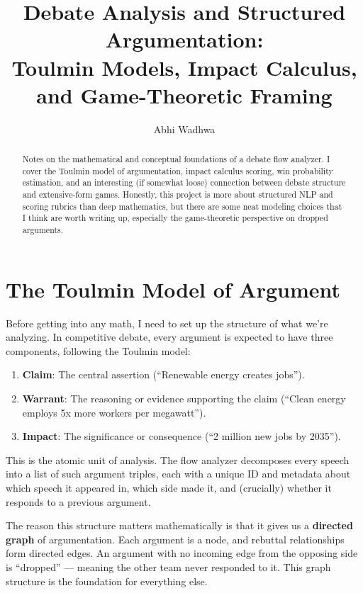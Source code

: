 \documentclass[11pt]{article}
\title{Debate Analysis and Structured Argumentation:\\Toulmin Models, Impact Calculus, and Game-Theoretic Framing}
\author{Abhi Wadhwa}
\date{}
\begin{document}
\maketitle

\begin{abstract}
Notes on the mathematical and conceptual foundations of a debate flow analyzer. I cover the Toulmin model of argumentation, impact calculus scoring, win probability estimation, and an interesting (if somewhat loose) connection between debate structure and extensive-form games. Honestly, this project is more about structured NLP and scoring rubrics than deep mathematics, but there are some neat modeling choices that I think are worth writing up, especially the game-theoretic perspective on dropped arguments.
\end{abstract}

\section{The Toulmin Model of Argument}

Before getting into any math, I need to set up the structure of what we're analyzing. In competitive debate, every argument is expected to have three components, following the Toulmin model:

\begin{enumerate}
    \item \textbf{Claim}: The central assertion (``Renewable energy creates jobs'').
    \item \textbf{Warrant}: The reasoning or evidence supporting the claim (``Clean energy employs 5x more workers per megawatt'').
    \item \textbf{Impact}: The significance or consequence (``2 million new jobs by 2035'').
\end{enumerate}

This is the atomic unit of analysis. The flow analyzer decomposes every speech into a list of such argument triples, each with a unique ID and metadata about which speech it appeared in, which side made it, and (crucially) whether it responds to a previous argument.

The reason this structure matters mathematically is that it gives us a \textbf{directed graph} of argumentation. Each argument is a node, and rebuttal relationships form directed edges. An argument with no incoming edge from the opposing side is ``dropped'' --- meaning the other team never responded to it. This graph structure is the foundation for everything else.
\end{document}
